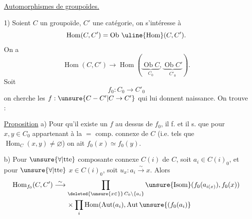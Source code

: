 \uline{Automorphismes de groupoïdes.}

1) Soient $C$  un groupoïde,
$C'$ une catégorie, on s'intéresse à
\[
\operatorname{Hom}(C,C')=\operatorname{Ob}\,\uline{\operatorname{Hom}}(C,C').
\]
On a
\[
\operatorname{Hom}(C,C')\longrightarrow
\operatorname{Hom}(\underbrace{\operatorname{Ob}C}_{C_0},\underbrace{\operatorname{Ob}C'}_{C'_0}).
\]
Soit
\[ f_0:C_0\longrightarrow C'_0 \]
on cherche les $f:\unsure{C-C'|C\to C'}$ qui lui donnent naissance. On trouve :

\uline{Proposition} a) Pour qu'il existe un $f$ au dessus de $f_0$, il f. et il s.
que pour $x,y\in C_0$ appartenant à la $=$ comp. connexe de $C$
(i.e. tels que $\operatorname{Hom}_C(x,y)\ne\varnothing$) on ait
$f_0(x)\simeq f_0(y)$.

b) Pour $\unsure{\forall|\text{tte}}$ composante connexe $C(i)$ de $C$, soit $a_i\in C(i)_0$,
et pour $\unsure{\forall|\text{tte}}$ $x\in C(i)_0$, soit
$u_x:a_i\overset{\sim}{\longrightarrow}x$. Alors
\[
\begin{aligned}
\operatorname{Hom}_{f_0}(C,C')&\overset{\sim}{\longrightarrow}
\prod_{\deleted{\unsure{x\in}}\,C_0\setminus\{a_i\}}
\unsure{\operatorname{Isom}}(f_0(a_{i(x)}),f_0(x))\\
&\qquad\times\prod_i\operatorname{Hom}(\operatorname{Aut}(a_i),\operatorname{Aut}\unsure{(f_0(a_i)}
\end{aligned}
\]

